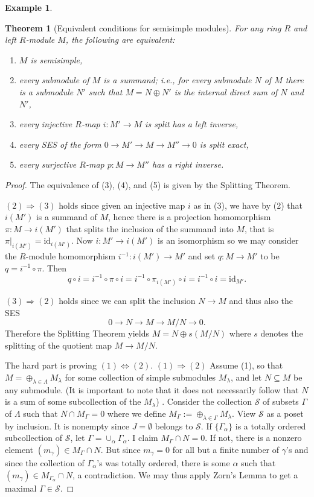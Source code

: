 \documentclass{amsart}[12pt]
\def\cS{\mathcal S}
\newcommand{\id}{\mathrm{id}}
\numberwithin{equation}{section}
\theoremstyle{plain} %
\newtheorem{thm}[equation]{Theorem}
\theoremstyle{definition}
\newtheorem{ex}[equation]{Example}
\theoremstyle{remark}
\begin{document}
\begin{ex}
\begin{thm}[Equivalent conditions for semisimple modules]
 \label{prop93b} 
For any ring $R$ and left $R$-module $M$, the following are equivalent:
  \begin{enumerate}
  \item $M$ is semisimple,
  \item every submodule of $M$ is a summand; i.e., for every submodule $N$ of $M$ there is a submodule $N'$ such that
    $M=N\oplus N'$ is the internal direct sum of $N$ and $N'$,
  \item every injective $R$-map $i: M' \to M$ is split has a left inverse,
  \item every SES of the form $0 \to M' \to M \to M'' \to 0$ is split exact,
  \item every surjective $R$-map $p: M \to M''$ has a right inverse.
  \end{enumerate}
\end{thm}

\begin{proof} 
The equivalence of (3), (4), and (5) is given by the Splitting Theorem.

$(2) \Rightarrow (3)$ holds since given an injective map $i$ as in (3), we have by (2) that $i(M')$ is a summand of $M$, hence there is a projection homomorphism $\pi:M\to i(M')$ that splits the inclusion of the summand into $M$, that is $\pi|_{i(M')}=\id_{i(M')}$. Now $i:M'\to i(M')$ is an isomorphism so we may consider the $R$-module homomorphism $i^{-1}:i(M')\to M'$ and set $q:M\to M'$ to be $q=i^{-1}\circ \pi$. Then 
\[q\circ i=i^{-1}\circ \pi \circ i=i^{-1}\circ \pi_{i(M')} \circ i= i^{-1}\circ i=\id_{M'}.\]

$(3) \Rightarrow (2)$ holds since we can split the inclusion $N\to M$ and thus also the SES
\[
0\to N\to M\to M/N \to 0.
\]
Therefore the Splitting Theorem yields $M=N\oplus s(M/N)$ where $s$ denotes the splitting of the quotient map $M\to M/N$.

The hard part is proving $(1) \Leftrightarrow (2)$. 
 $(1) \Rightarrow (2)$ Assume (1), so that $M = \oplus_{\lambda \in \Lambda} M_\lambda$ for some collection of simple submodules $M_\lambda$,  and let $N \subseteq M$ be any submodule. (It is important to note that it does not necessarily follow that $N$ is a sum of some subcollection of the $M_\lambda$) . 
  Consider the collection $\cS$ of subsets $\Gamma$ of $\Lambda$ such that $N \cap M_\Gamma = 0$ where we define $M_\Gamma := \oplus_{\lambda \in \Gamma} M_\lambda$. View $\cS$ as a poset by inclusion.
  It is nonempty since $J = \emptyset$ belongs to $\cS$. If $\{\Gamma_\alpha\}$ is a totally ordered subcollection of $\cS$, let
  $\Gamma = \cup_\alpha \Gamma_\alpha$. I claim $M_\Gamma \cap N = 0$. If not, there is a nonzero element $(m_\gamma) \in M_\Gamma \cap N$. But since $m_\gamma = 0$ for all but a finite number of $\gamma$'s
  and since the collection of $\Gamma_\alpha$'s was totally ordered, there is some $\alpha$ such that $(m_\gamma) \in M_{\Gamma_\alpha} \cap N$, a contradiction.
  We may thus apply Zorn's Lemma to get a maximal $\Gamma \in \cS$.


\end{proof}
\end{ex}
\end{document}
